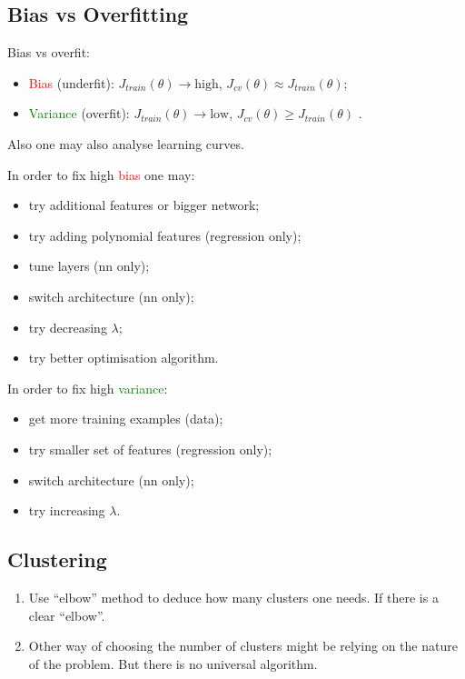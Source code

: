 \documentclass[a4paper,11pt]{article}
\begin{document}
\subsection{Bias vs Overfitting}
Bias vs overfit:
\begin{itemize}
\item \textcolor{Red}{Bias} (underfit): \textcolor{OliveGreen}{$J_{train} \left( \theta \right) \rightarrow \text{high}$}, \textcolor{OliveGreen}{$J_{cv} \left( \theta \right) \approx J_{train} \left( \theta \right)$};
\item \textcolor{Green}{Variance} (overfit): \textcolor{OliveGreen}{$J_{train} \left( \theta \right) \rightarrow \text{low}$}, \textcolor{OliveGreen}{$J_{cv} \left( \theta \right) \geq J_{train} \left( \theta \right)$} .
\end{itemize}

Also one may also analyse learning curves.

In order to fix high \textcolor{Red}{bias} one may:
\begin{itemize}
\item try additional features or bigger network;
\item try adding polynomial features (regression only);
\item tune layers (nn only);
\item switch architecture (nn only);
\item try decreasing \textcolor{OliveGreen}{$\lambda$};
\item try better optimisation algorithm.
\end{itemize}

In order to fix high \textcolor{Green}{variance}:
\begin{itemize}
\item get more training examples (data);
\item try smaller set of features (regression only);
\item switch architecture (nn only);
\item try increasing \textcolor{OliveGreen}{$\lambda$}.
\end{itemize}

\subsection{Clustering}
\begin{enumerate}
\item Use ``elbow'' method to deduce how many clusters one needs. If there is a clear ``elbow''.
\item Other way of choosing the number of clusters might be relying on the nature of the problem. But there is no universal algorithm.
\end{enumerate}
\end{document}

